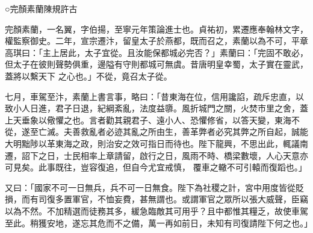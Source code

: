 
\begin{pinyinscope}

 ○完顏素蘭陳規許古



 完顏素蘭，一名翼，字伯揚，至寧元年策論進士也。貞祐初，累遷應奉翰林文字，權監察御史。二年，宣宗遷汴，留皇太子於燕都，既而召之，素蘭以為不可，平章高琪曰：「主上居此，太子宜從。且汝能保都城必完否？」素蘭曰：「完固不敢必，但太子在彼則聲勢俱重，邊隘有守則都城可無虞。昔唐明皇幸蜀，太子實在靈武，蓋將以繫天下
 之心也。」不從，竟召太子從。



 七月，車駕至汴，素蘭上書言事，略曰：「昔東海在位，信用讒諂，疏斥忠直，以致小人日進，君子日退，紀綱紊亂，法度益隳。風折城門之關，火焚市里之舍，蓋上天垂象以儆懼之也。言者勸其親君子、遠小人、恐懼修省，以答天變，東海不從，遂至亡滅。夫善救亂者必迹其亂之所由生，善革弊者必究其弊之所自起，誠能大明黜陟以革東海之政，則治安之效可指日而待也。陛下龍興，不思出此，輒議南遷，詔下之日，士民相率上章請留，啟行之日，風雨不時、橋梁數壞，人心天意亦可見矣。此事既往，豈容復追，但自今尤宜戒慎，
 覆車之轍不可引轅而復蹈也。」



 又曰：「國家不可一日無兵，兵不可一日無食。陛下為社稷之計，宮中用度皆從貶損，而有司復多置軍官，不恤妄費，甚無謂也。或謂軍官之眾所以張大威聲，臣竊以為不然。不加精選而徒務其多，緩急臨敵其可用乎？且中都惟其糧乏，故使車駕至此。稍獲安地，遂忘其危而不之備，萬一再如前日，未知有司復請陛下何之也。」




\end{pinyinscope}
